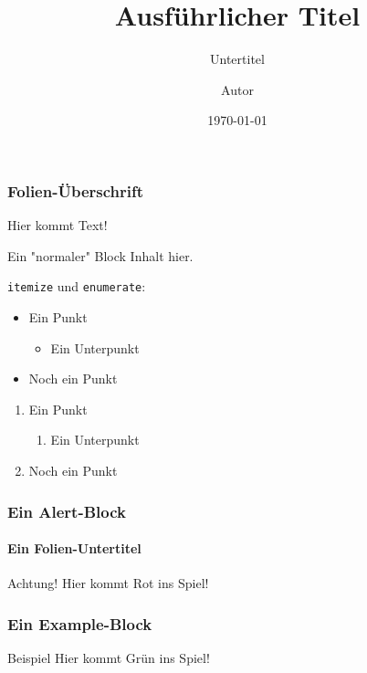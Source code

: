 \documentclass[german, ngerman]{beamer}
\title[Kurzer Titel]{Ausführlicher Titel}
\subtitle{Untertitel}
\author{Autor}
\date{\today}
\begin{document}
\begin{frame}
	\titlepage
\end{frame}

\begin{frame}
	\frametitle{Folien-Überschrift}

	Hier kommt Text!

	\begin{block}{Ein "normaler" Block}
		Inhalt hier.
	\end{block}

	\texttt{itemize} und \texttt{enumerate}:
	\begin{itemize}
		\item Ein Punkt
		\begin{itemize}
			\item Ein Unterpunkt
		\end{itemize}
		\item Noch ein Punkt
	\end{itemize}
	\begin{enumerate}
		\item Ein Punkt
		\begin{enumerate}
			\item Ein Unterpunkt
		\end{enumerate}
		\item Noch ein Punkt
	\end{enumerate}
\end{frame}

\begin{frame}
	\frametitle{Ein Alert-Block}
	\framesubtitle{Ein Folien-Untertitel}

	\begin{alertblock}{Achtung!}
		Hier kommt Rot ins Spiel!
	\end{alertblock}
\end{frame}

\begin{frame}
	\frametitle{Ein Example-Block}

	\begin{exampleblock}{Beispiel}
		Hier kommt Grün ins Spiel!
	\end{exampleblock}
\end{frame}
\end{document}
